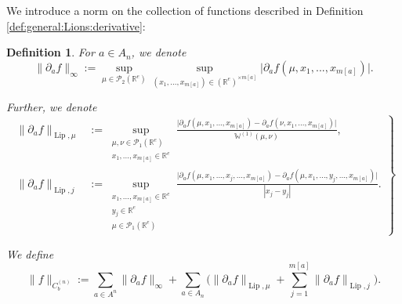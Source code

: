 \documentclass[a4paper,11pt,twoside]{article}
\numberwithin{equation}{section}
\theoremstyle{plain}
\newtheorem{definition}[theorem]{Definition}
\newcommand{\bR}{\mathbb{R}}
\newcommand{\bW}{\mathbb{W}}
\newcommand{\cP}{\mathcal{P}}
\DeclareMathOperator{\lip}{Lip}
\newcommand{\1}{\mathbbm{1}}
\begin{document}
	We introduce a norm on the collection of functions described in Definition \ref{def:general:Lions:derivative}:
	\begin{definition}
		\label{definition:FunctionNorm-non}
		For $a\in A_n$, we denote
		\begin{equation}
			\label{eq:definition:FunctionNorm1-non}
			\| \partial_a f\|_\infty:= \sup_{\mu \in \cP_2(\bR^e)}  \sup_{(x_1, ..., x_{m[a]}) \in (\bR^e)^{\times m[a]}} \big| \partial_a f(\mu, x_1, ..., x_{m[a]}) \big|. 
		\end{equation}
		
		Further, we denote
		\begin{equation}
			\label{eq:definition:FunctionNorm2-non}
			\left.\begin{aligned}
				\big\| \partial_a f \big\|_{\lip, \mu}
				&:=
				\sup_{\substack{ \mu, \nu\in \cP_1(\bR^e) \\ x_1, ..., x_{m[a]} \in \bR^e}} \frac{\big| \partial_a f(\mu, x_1, ..., x_{m[a]}) - \partial_a f(\nu, x_1, ..., x_{m[a]}) \big|}{\bW^{(1)}(\mu, \nu)}, 
				\\
				\big\| \partial_a f \big\|_{\lip, j}
				&:= 
				\sup_{\substack{x_1, ..., x_{m[a]} \in \bR^e \\ y_j \in \bR^e \\ \mu \in \cP_1(\bR^e)}} \frac{\big| \partial_a f(\mu, x_1, ..., x_j, ..., x_{m[a]}) - \partial_a f(\mu, x_1,..., y_j, ..., x_{m[a]}) \big|}{|x_j - y_j|}. 
			\end{aligned}\right\rbrace
		\end{equation}
		
		We define
		\begin{equation}
			\label{eq:definition:FunctionNorm-non}
			\big\| f \big\|_{C_b^{(n)}} := \sum_{ a\in A^{n}} \big\| \partial_a f \big\|_\infty
			+
			\sum_{a\in A_{n}} \bigg( \big\| \partial_a f \big\|_{\lip, \mu} + \sum_{j=1}^{m[a]} \big\| \partial_a f \big\|_{\lip, j} \bigg). 
		\end{equation}
	\end{definition}
	
\end{document}

